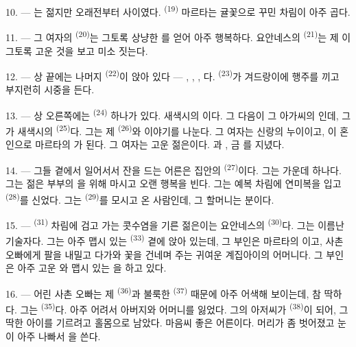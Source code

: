10. --- 는 젊지만 오래전부터  사이였다.
 \textsuperscript{(19)} 마르타는 귤꽃으로 꾸민  차림이
아주 곱다.

11. --- 그 여자의  \textsuperscript{(20)}는 그토록 상냥한
를 얻어 아주 행복하다. 요안네스의  \textsuperscript{(21)}는
제 이 그토록 고운 것을 보고 미소 짓는다.

12. --- 상 끝에는 나머지  \textsuperscript{(22)}이 앉아 있다 —
, , , 다.
 \textsuperscript{(23)}가 겨드랑이에 행주를 끼고 부지런히 시중을 든다.

\VUsaut{3.0mm}

13. --- 상 오른쪽에는  \textsuperscript{(24)} 하나가 있다. 새색시의
이다. 그 다음이 그 아가씨의 인데, 그가 새색시의
 \textsuperscript{(25)}다. 그는 제  \textsuperscript{(26)}와
이야기를 나눈다. 그 여자는 신랑의 누이이고, 이 혼인으로 마르타의 가
된다. 그 여자는 고운 젊은이다. 과 , 금
를 지녔다.

14. --- 그들 곁에서 일어서서 잔을 드는 어른은 집안의  \textsuperscript{(27)}이다.
그는  가운데 하나다. 그는  젊은 부부의
을 위해 마시고 오랜 행복을 빈다. 그는 예복 차림에 연미복을 입고
 \textsuperscript{(28)}를 신었다. 그는 
\textsuperscript{(29)}를 모시고 온 사람인데, 그 할머니는  분이다.

15. ---  \textsuperscript{(31)} 차림에 검고 가는 콧수염을 기른 젊은이는
요안네스의  \textsuperscript{(30)}다. 그는 이름난 기술자다. 그는 아주 맵시
있는  \textsuperscript{(33)} 곁에 앉아 있는데, 그 부인은 마르타의
이고, 사촌 오빠에게 팔을 내밀고 다가와 꽃을 건네며
  주는 귀여운 계집아이의 어머니다. 그 부인은
아주 고운 와 맵시 있는 을 하고 있다.

16. --- 어린 사촌 오빠는 제  \textsuperscript{(36)}과 불룩한
 \textsuperscript{(37)} 때문에 아주 어색해 보이는데, 참 딱하다. 그는
 \textsuperscript{(35)}다. 아주 어려서 아버지와 어머니를 잃었다. 그의
아저씨가  \textsuperscript{(38)}이 되어, 그 딱한 아이를 기르려고 홀몸으로
남았다. 마음씨 좋은 어른이다. 머리가 좀 벗어졌고 눈이 아주 나빠서 을
쓴다.

